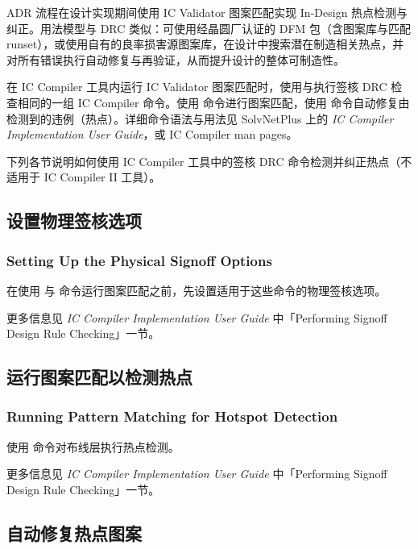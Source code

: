 ADR 流程在设计实现期间使用 IC Validator 图案匹配实现 In-Design 热点检测与纠正。用法模型与 DRC 类似：可使用经晶圆厂认证的 DFM 包（含图案库与匹配 runset），或使用自有的良率损害源图案库，在设计中搜索潜在制造相关热点，并对所有错误执行自动修复与再验证，从而提升设计的整体可制造性。

在 IC Compiler 工具内运行 IC Validator 图案匹配时，使用与执行签核 DRC 检查相同的一组 IC Compiler 命令。使用  命令进行图案匹配，使用  命令自动修复由  检测到的违例（热点）。详细命令语法与用法见 SolvNetPlus 上的 \textit{IC Compiler Implementation User Guide}，或 IC Compiler man pages。

下列各节说明如何使用 IC Compiler 工具中的签核 DRC 命令检测并纠正热点（不适用于 IC Compiler II 工具）。

\subsection{设置物理签核选项}
\subsubsection*{Setting Up the Physical Signoff Options}

在使用  与  命令运行图案匹配之前，先设置适用于这些命令的物理签核选项。

\begin{seeAlsoBox}
更多信息见 \textit{IC Compiler Implementation User Guide} 中「Performing Signoff Design Rule Checking」一节。
\end{seeAlsoBox}

\subsection{运行图案匹配以检测热点}
\subsubsection*{Running Pattern Matching for Hotspot Detection}

使用  命令对布线层执行热点检测。

\begin{seeAlsoBox}
更多信息见 \textit{IC Compiler Implementation User Guide} 中「Performing Signoff Design Rule Checking」一节。
\end{seeAlsoBox}

\subsection{自动修复热点图案}
